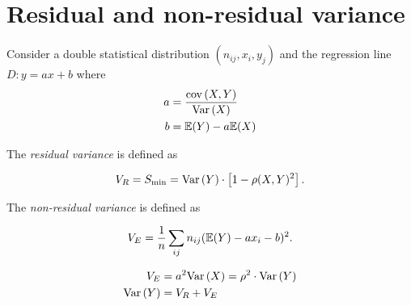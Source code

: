 \documentclass{report}
\begin{document}
\section{Residual and non-residual variance}

Consider a double statistical distribution $(n_{ij},x_i,y_j)$ and the regression line $D: y = ax + b$ where
\begin{align*}
    a & = \frac{\mathrm{cov}\left( X,Y \right)}{\mathrm{Var}\left( X \right)} \\
    b & = \mathbb{E}(Y) - a\mathbb{E}(X)
\end{align*}

The \emph{residual variance} is defined as

\[
    V_R = S_{\min} = \mathrm{Var}\left( Y \right)\cdot\left[ 1 - \rho(X,Y)^2 \right]
    .\]

The \emph{non-residual variance} is defined as

\[
    V_{E} = \frac{1}{n} \sum_{ij} n_{ij}(\mathbb{E}(Y) - ax_i -b)^2 
    .\]

\begin{align*}
    V_E &= a^2\mathrm{Var}\left( X \right) = \rho^2\cdot\mathrm{Var}\left( Y \right) \\
    \mathrm{Var}\left( Y \right) &= V_R + V_E
\end{align*}
\end{document}
